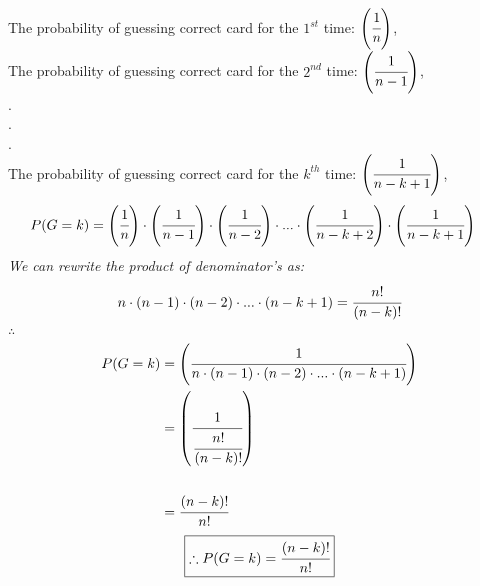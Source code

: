 \documentclass{article}
\begin{document}
\begin{enumerate}
  The probability of guessing correct card for the \(1^{st}\) time: \(\left(\cfrac{1}{n}\right)\),\\
  The probability of guessing correct card for the \(2^{nd}\) time: \(\left(\cfrac{1}{n-1}\right)\),\\
  .\\.\\.\\
  The probability of guessing correct card for the \(k^{th}\) time: \(\left(\cfrac{1}{n-k+1}\right)\),\\
  \begin{align*}
    P(G=k) &= \left(\cfrac{1}{n}\right)\cdot\left(\cfrac{1}{n-1}\right)\cdot\left(\cfrac{1}{n-2}\right)\cdot ... \cdot\left(\cfrac{1}{n-k+2}\right)\cdot\left(\cfrac{1}{n-k+1}\right)
  \end{align*}
  \textit{We can rewrite the product of denominator's as:}
  \begin{align*}
    n\cdot\left(n-1\right)\cdot\left(n-2\right)\cdot...\cdot\left(n-k+1\right) = \cfrac{n!}{(n-k)!}
  \end{align*}
  $\therefore$
  \begin{align*}
    P(G=k) &= \left(\cfrac{1}{n\cdot\left(n-1\right)\cdot\left(n-2\right)\cdot...\cdot\left(n-k+1\right)}\right)\\
    &= \left(\cfrac{1}{\cfrac{n!}{(n-k)!}}\right)\\\\
    &= \cfrac{(n-k)!}{n!}
  \end{align*}
  \[
     \boxed{\therefore P(G=k) = \cfrac{(n-k)!}{n!}}\\
  \]


\end{enumerate}
\end{document}
